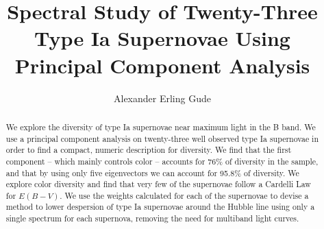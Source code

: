 \documentclass[11pt,preprint]{aastex}
\begin{document}


\title{Spectral Study of Twenty-Three Type Ia Supernovae Using Principal Component Analysis}
\author{Alexander Erling Gude}

\begin{abstract}
We explore the diversity of type Ia supernovae near maximum light in the B band. We use a principal component analysis on twenty-three well observed type Ia supernovae in order to find a compact, numeric description for diversity. We find that the first component -- which mainly controls color -- accounts for 76\% of diversity in the sample, and that by using only five eigenvectors we can account for 95.8\% of diversity. We explore color diversity and find that very few of the supernovae follow a Cardelli Law for $E(B-V)$. We use the weights calculated for each of the supernovae to devise a method to lower despersion of type Ia supernovae around the Hubble line using only a single spectrum for each supernova, removing the need for multiband light curves.
\end{abstract}

%




%
%
%






\clearpage %




\end{document}
